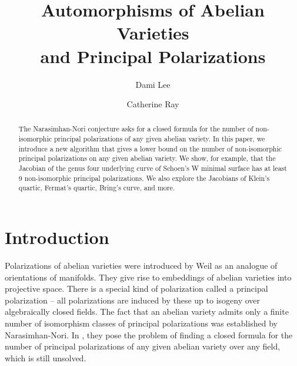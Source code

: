 \documentclass[12pt,reqno]{amsart}
\title[Automorphisms of Abelian Varieties and Principal Polarizations]{Automorphisms of Abelian Varieties \\ and Principal Polarizations}
\author{Dami Lee}
\author{Catherine Ray}
\theoremstyle{definition}
\theoremstyle{remark}
\begin{document}
  
\maketitle

\begin{abstract} %
The Narasimhan-Nori conjecture asks for a closed formula for the number of non-isomorphic principal polarizations of any given abelian variety. In this paper, we introduce a new algorithm that gives a lower bound on the number of non-isomorphic principal polarizations on any given abelian variety. We show, for example, that the Jacobian of the genus four underlying curve of Schoen's W minimal surface has at least 9 non-isomorphic principal polarizations. We also explore the Jacobians of Klein's quartic, Fermat's quartic, Bring's curve, and more.   
\end{abstract}

\tableofcontents

\section{Introduction}


Polarizations of abelian varieties were introduced by Weil as an analogue of orientations of manifolds. They give rise to embeddings of abelian varieties into projective space. There is a special kind of polarization called a principal polarization -- all polarizations are induced by these up to isogeny over algebraically closed fields. The fact that an abelian variety admits only a finite number of isomorphism classes of principal polarizations was established by Narasimhan-Nori. In \cite{nn}, they pose the problem of finding a closed formula for the number of principal polarizations of any given abelian variety over any field, which is still unsolved. 
\end{document}
